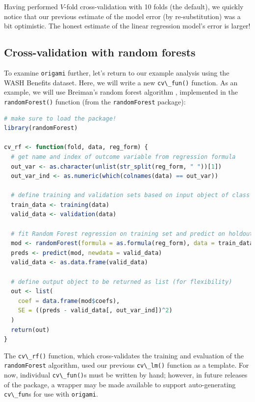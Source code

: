 \documentclass[
  12pt, krantz2,
]{krantz}
\newcommand{\passthrough}[1]{#1}
\newcommand{\1}{\mathbbm{1}}
\theoremstyle{definition}
\theoremstyle{definition}
\theoremstyle{definition}
\theoremstyle{definition}
\theoremstyle{remark}
\begin{document}
Having performed \(V\)-fold cross-validation with 10 folds (the default), we
quickly notice that our previous
estimate of the model error (by re-substitution) was a bit optimistic. The honest
estimate of the linear regression model's error is larger!

\hypertarget{cross-validation-with-random-forests}{%
\subsection{Cross-validation with random forests}\label{cross-validation-with-random-forests}}

To examine \passthrough{\lstinline!origami!} further, let's return to our example analysis using the
WASH Benefits dataset. Here, we will write a new \passthrough{\lstinline!cv\_fun()!} function. As an
example, we will use Breiman's random forest algorithm \citep{breiman2001random},
implemented in the \passthrough{\lstinline!randomForest()!} function (from the \passthrough{\lstinline!randomForest!} package):

\begin{lstlisting}[language=R]
# make sure to load the package!
library(randomForest)

cv_rf <- function(fold, data, reg_form) {
  # get name and index of outcome variable from regression formula
  out_var <- as.character(unlist(str_split(reg_form, " "))[1])
  out_var_ind <- as.numeric(which(colnames(data) == out_var))

  # define training and validation sets based on input object of class "folds"
  train_data <- training(data)
  valid_data <- validation(data)

  # fit Random Forest regression on training set and predict on holdout set
  mod <- randomForest(formula = as.formula(reg_form), data = train_data)
  preds <- predict(mod, newdata = valid_data)
  valid_data <- as.data.frame(valid_data)

  # define output object to be returned as list (for flexibility)
  out <- list(
    coef = data.frame(mod$coefs),
    SE = ((preds - valid_data[, out_var_ind])^2)
  )
  return(out)
}
\end{lstlisting}

The \passthrough{\lstinline!cv\_rf()!} function, which cross-validates the training and evaluation of the
\passthrough{\lstinline!randomForest!} algorithm, used our previous \passthrough{\lstinline!cv\_lm()!} function as a template.
For now, individual \passthrough{\lstinline!cv\_fun()!}s must be written by hand; however, in future
releases of the package, a wrapper may be made available to support
auto-generating \passthrough{\lstinline!cv\_fun!}s for use with \passthrough{\lstinline!origami!}.
\end{document}
